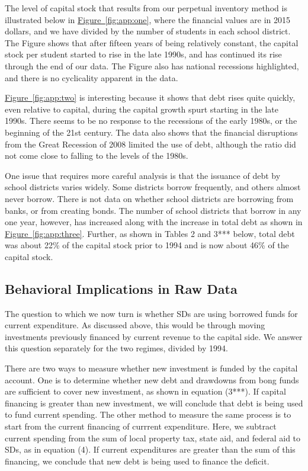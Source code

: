 The level of capital stock that results from our perpetual inventory method is illustrated below in \hyperref[fig:app:one]{Figure~\ref*{fig:app:one}}, where the financial values are in 2015 dollars, and we have divided by the number of students in each school district. The Figure shows that after fifteen years of being relatively constant, the capital stock per student started to rise in the late 1990s, and has continued its rise through the end of our data. The Figure also has national recessions highlighted, and there is no cyclicality apparent in the data.

\hyperref[fig:app:two]{Figure~\ref*{fig:app:two}} is interesting because it shows that debt rises quite quickly, even relative to capital, during the capital growth spurt starting in the late 1990s. There seems to be no response to the recessions of the early 1980s, or the beginning of the 21st century. The data also shows that the financial disruptions from the Great Recession of 2008 limited the use of debt, although the ratio did not come close to falling to the levels of the 1980s.

One issue that requires more careful analysis is that the issuance of debt by school districts varies widely. Some districts borrow frequently, and others almost never borrow. There is not data on whether school districts are borrowing from banks, or from creating bonds. The number of school districts that borrow in any one year, however, has increased along with the increase in total debt as shown in \hyperref[fig:app:three]{Figure~\ref*{fig:app:three}}.  Further, as shown in Tables 2 and 3*** below, total debt was about 22\% of the capital stock prior to 1994 and is now about 46\% of the capital stock.

\subsection{Behavioral Implications in Raw Data}

The question to which we now turn is whether SDs are using borrowed funds for current expenditure.  As discussed above, this would be through moving investments previously financed by current revenue to the capital side.  We answer this question separately for the two regimes, divided by 1994.

There are two ways to measure whether new investment is funded by the capital account.  One is to determine whether new debt and drawdowns from bong funds are sufficient to cover new investment, as shown in equation (3***).  If capital financing is greater than new investment, we will conclude that debt is being used to fund current spending.  The other method to measure the same process is to start from the current financing of currrent expenditure.  Here, we subtract current spending from the sum of local property tax, state aid, and federal aid to SDs, as in equation (4).  If current expenditures are greater than the sum of this financing, we conclude that new debt is being used to finance the deficit.

